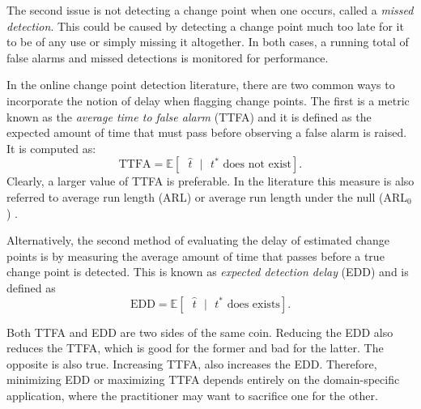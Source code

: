 
The second issue is not detecting a change point when one occurs, called a \textit{missed detection}. This could be caused by detecting a change point much too late for it to be of any use or simply missing it altogether. 
In both cases, a running total of false alarms and missed detections is monitored for performance. 

In the online change point detection literature, there are two common ways to incorporate the notion of delay when flagging change points. The first is a metric known as the \textit{average time to false alarm} (TTFA) and it is defined as 
the expected amount of time that must pass before observing a false alarm is raised. It is computed as:
\begin{equation}
\label{ttfa}
\text{TTFA} = \mathbb{E}[\text{ }  \hat{t} \text{ } |\text{ }  t^* \text{ does not exist} ].
\end{equation}
Clearly, a larger value of TTFA is preferable. In the literature this measure is also referred to average run length (ARL) or average run length under the null (ARL$_0$) \cite{johnson2017detecting}. 

Alternatively, the second method of evaluating the delay of estimated change points is by measuring the average amount of time that passes before a true change point is detected. This is known as \textit{expected detection delay} (EDD) and is defined as 
\begin{equation}
\label{edd}
\text{EDD} = \mathbb{E}[\text{ }  \hat{t} \text{ } |\text{ }  t^* \text{ does exists} ].
\end{equation}

Both TTFA and EDD are two sides of the same coin. Reducing the EDD also reduces the TTFA, which is good for the former and bad for the latter. The opposite is also true. Increasing TTFA, also increases the EDD. Therefore, minimizing EDD or maximizing TTFA depends entirely on the domain-specific application, where the practitioner may want to sacrifice one for the other. 

